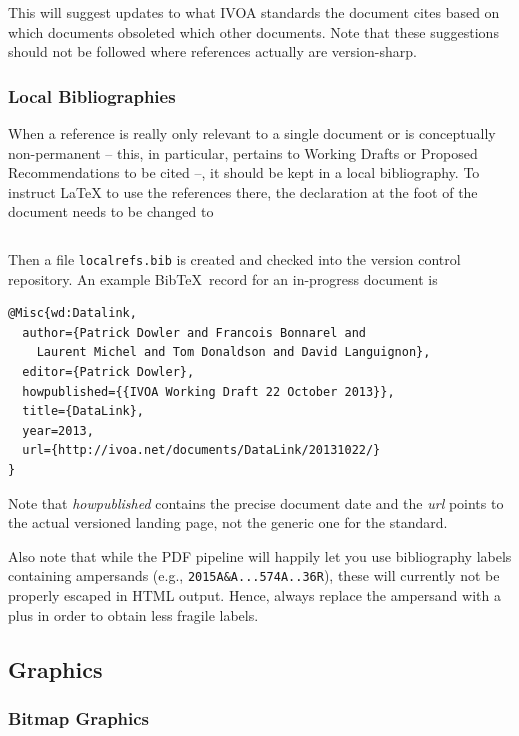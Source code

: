 \documentclass[11pt,a4paper]{ivoa}
\newcommand{\BibTeX}{Bib\TeX}
\begin{document}
\noindent This will suggest updates to what IVOA standards the document cites
based on which documents obsoleted which other documents.  Note that
these suggestions should not be followed where references actually are
version-sharp.

\subsubsection{Local Bibliographies}

When a reference is really only relevant to a single document or is
conceptually non-permanent -- this, in particular, pertains to Working
Drafts or Proposed Recommendations to be cited --, it should be kept in a
local bibliography.  To instruct \LaTeX{} to use the references there,
the declaration at the foot of the document needs to be
changed to

\begin{lstlisting}

\end{lstlisting}

Then a file \texttt{localrefs.bib} is created and checked into the
version control repository.  An example \BibTeX\ record for an
in-progress document is

\begin{lstlisting}
@Misc{wd:Datalink,
  author={Patrick Dowler and Francois Bonnarel and
    Laurent Michel and Tom Donaldson and David Languignon},
  editor={Patrick Dowler},
  howpublished={{IVOA Working Draft 22 October 2013}},
  title={DataLink},
  year=2013,
  url={http://ivoa.net/documents/DataLink/20131022/}
}
\end{lstlisting}

Note that \emph{howpublished} contains the precise document date and the
\emph{url} points to the actual versioned landing page, not the generic
one for the standard.

Also note that while the PDF pipeline will happily let you use
bibliography labels containing ampersands (e.g.,
\verb|2015A&A...574A..36R|), these will currently not be properly
escaped in HTML output.  Hence, always replace the ampersand with a plus
in order to obtain less fragile labels.

\subsection{Graphics}

\subsubsection{Bitmap Graphics}
\end{document}
